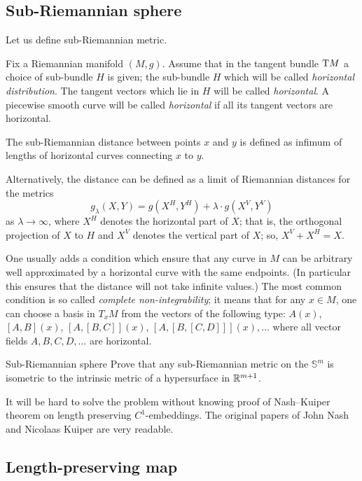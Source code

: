 \subsection*{Sub-Riemannian sphere\thm}

Let us define sub-Riemannian metric.

Fix a Riemannian manifold $(M,g)$.
Assume that in the tangent bundle $\mathrm{T} M$ 
a choice of sub-bundle $H$ is given;
the sub-bundle $H$ which will be called  \emph{horizontal distribution}.
The tangent vectors which lie in $H$ will be called {}\emph{horizontal}.
A piecewise smooth curve will be called {}\emph{horizontal}
if all its tangent vectors are horizontal.

The sub-Riemannian distance between points $x$ and $y$ is defined as infimum of lengths of horizontal curves connecting $x$ to $y$.

Alternatively, the distance can be defined as a limit of Riemannian distances 
for the metrics 
\[g_\lambda(X,Y)=g(X^H,Y^H)+\lambda\cdot g(X^V,Y^V)\] 
as $\lambda\to \infty$,
where $X^H$ denotes the horizontal part of $X$;
that is, the orthogonal projection of $X$ to $H$
and $X^V$ denotes the vertical part of $X$;
so, $X^V+X^H=X$.

One usually adds a condition which ensure that any curve in $M$ can be arbitrary well approximated by a horizontal curve with the same endpoints.
(In particular this ensures that the distance will not take infinite values.)
The most common condition is so called  {}\emph{complete non-integrability};
it means that for any $x\in M$, 
one can choose a basis in $T_xM$
from the vectors of the following type:
$A(x)$, $[A,B](x)$, $[A,[B,C]](x)$, $[A,[B,[C,D]]](x),\dots$ where all vector fields $A,B,C,D, \dots$ are horizontal.

\begin{pr}{\thm}{Sub-Riemannian sphere}\label{sub-Riemannian} 
Prove that any sub-Riemannian metric 
on the $\mathbb{S}^m$ is isometric to the intrinsic metric of a hypersurface in $\mathbb{R}^{m+1}$.
\end{pr}


It will be hard to solve the problem without knowing proof of Nash--Kuiper theorem on length preserving $C^1$-embeddings.
The original papers of John Nash 
and Nicolaas Kuiper \cite[see][]{nash,kuiper} are very readable.

\subsection*{Length-preserving map\thm}


